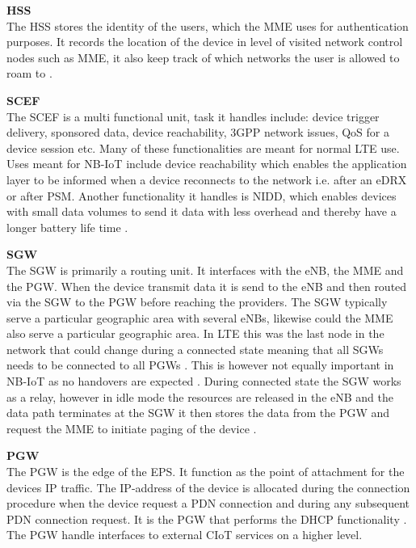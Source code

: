 \textbf{\gls{HSS}}\\
The \gls{HSS} stores the identity of the users, which the \gls{MME} uses for authentication purposes. It records the location of the device in level of visited network control nodes such as \gls{MME}, it also keep track of which networks the user is allowed to roam to \citep[ch. 3]{book_LTE_for_UMTS}.

\textbf{\gls{SCEF}}\\
The \gls{SCEF} is a multi functional unit, task it handles include: device trigger delivery, sponsored data, device reachability, \gls{3GPP} network issues, \gls{QoS} for a device session etc. Many of these functionalities are meant for normal \gls{LTE} use. Uses meant for \gls{NB-IoT} include device reachability which enables the application layer to be informed when a device reconnects to the network i.e. after an \gls{eDRX} or after \gls{PSM}. Another functionality it handles is \gls{NIDD}, which enables devices with small data volumes to send it data with less overhead and thereby have a longer battery life time .

\textbf{\gls{SGW}}\\
The \gls{SGW} is primarily a routing unit. It interfaces with the \gls{eNB}, the \gls{MME} and the \gls{PGW}. When the device transmit data it is send to the \gls{eNB} and then routed via the \gls{SGW} to the \gls{PGW} before reaching the providers. The \gls{SGW} typically serve a particular geographic area with several \gls{eNB}s, likewise could the \gls{MME} also serve a particular geographic area. In \gls{LTE} this was the last node in the network that could change during a connected state meaning that all \gls{SGW}s needs to be connected to all \gls{PGW}s \citep[ch. 3]{book_LTE_for_UMTS}. This is however not equally important in \gls{NB-IoT} as no handovers are expected \citep{REL-13}. During connected state the \gls{SGW} works as a relay, however in idle mode the resources are released in the \gls{eNB} and the data path terminates at the \gls{SGW} it then stores the data from the \gls{PGW} and request the \gls{MME} to initiate paging of the device \citep[ch. 3]{book_LTE_for_UMTS}.

\textbf{\gls{PGW}}\\
The \gls{PGW} is the edge of the \gls{EPS}. It function as the point of attachment for the devices \gls{IP} traffic. The \gls{IP}-address of the device is allocated during the connection procedure when the device request a \gls{PDN} connection and during any subsequent \gls{PDN} connection request. It is the \gls{PGW} that performs the \gls{DHCP} functionality \citep[ch. 3]{book_LTE_for_UMTS}. The \gls{PGW} handle interfaces to external CIoT services on a higher level.

